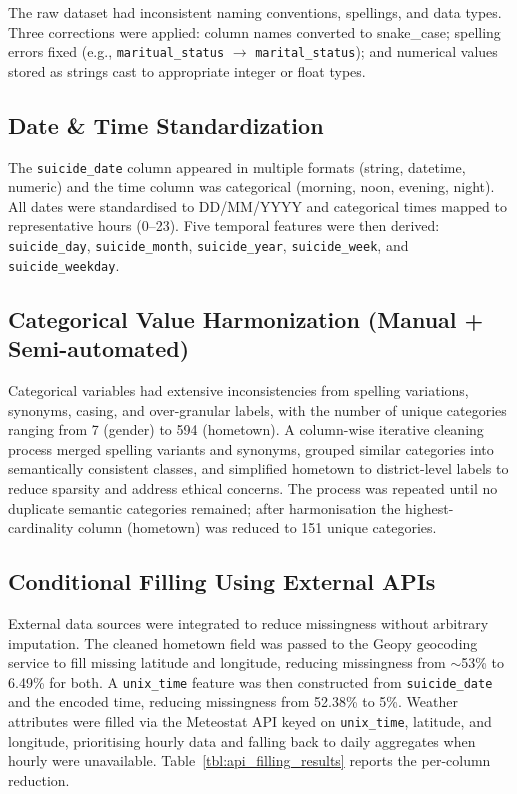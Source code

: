 The raw dataset had inconsistent naming conventions, spellings, and data types. Three corrections were applied: column names converted to snake\_case; spelling errors fixed (e.g., \texttt{maritual\_status} $\to$ \texttt{marital\_status}); and numerical values stored as strings cast to appropriate integer or float types.

\subsection{Date \& Time Standardization}

The \texttt{suicide\_date} column appeared in multiple formats (string, datetime, numeric) and the time column was categorical (morning, noon, evening, night). All dates were standardised to DD/MM/YYYY and categorical times mapped to representative hours (0--23). Five temporal features were then derived: \texttt{suicide\_day}, \texttt{suicide\_month}, \texttt{suicide\_year}, \texttt{suicide\_week}, and \texttt{suicide\_weekday}.

\subsection{Categorical Value Harmonization (Manual + Semi-automated)}

Categorical variables had extensive inconsistencies from spelling variations, synonyms, casing, and over-granular labels, with the number of unique categories ranging from 7 (gender) to 594 (hometown). A column-wise iterative cleaning process merged spelling variants and synonyms, grouped similar categories into semantically consistent classes, and simplified hometown to district-level labels to reduce sparsity and address ethical concerns. The process was repeated until no duplicate semantic categories remained; after harmonisation the highest-cardinality column (hometown) was reduced to 151 unique categories.

\subsection{Conditional Filling Using External APIs}

External data sources were integrated to reduce missingness without arbitrary imputation. The cleaned hometown field was passed to the Geopy geocoding service to fill missing latitude and longitude, reducing missingness from $\sim$53\% to 6.49\% for both. A \texttt{unix\_time} feature was then constructed from \texttt{suicide\_date} and the encoded time, reducing missingness from 52.38\% to 5\%. Weather attributes were filled via the Meteostat API keyed on \texttt{unix\_time}, latitude, and longitude, prioritising hourly data and falling back to daily aggregates when hourly were unavailable. Table~\ref{tbl:api_filling_results} reports the per-column reduction.

